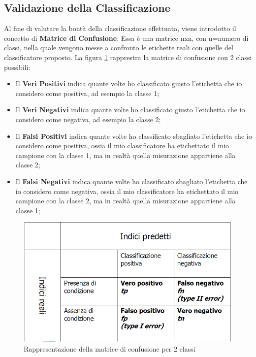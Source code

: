 \subsection{Validazione della Classificazione}
Al fine di valutare la bontà della classificazione effettuata, viene introdotto il concetto di \textbf{Matrice di Confusione}. Essa è una matrice nxn, con n=numero di classi, nella quale vengono messe a confronto le etichette reali con quelle del classificatore proposto. La figura \ref{immagine_matrice_confusione_2classi}  rapprestra la matrice di confusione con 2 classi possibili:
\begin{itemize}
	\item Il \textbf{Veri Positivi} indica quante volte ho classificato giusto l'etichetta che io considero come positiva, ad esempio la classe 1;
	\item Il \textbf{Veri Negativi} indica quante volte ho classificato giusto l'etichetta che io considero come negativa, ad esempio la classe 2;
	\item Il \textbf{Falsi Positivi} indica quante volte ho classificato sbagliato l'etichetta che io considero come positiva, ossia il mio classificatore ha etichettato il mio campione con la classe 1, ma in realtà quella misurazione appartiene alla classe 2;
	\item Il \textbf{Falsi Negativi} indica quante volte ho classificato sbagliato l'etichetta che io considero come negativa, ossia il mio classificatore ha etichettato il mio campione con la classe 2, ma in realtà quella misurazione appartiene alla classe 1;
\end{itemize}
\begin{figure}[h!]
	\centering
	\includegraphics[scale=0.5]{images/matrice_confusione.png}
	\caption{Rappresentazione della matrice di confusione per 2 classi}
	\label{immagine_matrice_confusione_2classi}
\end{figure}
